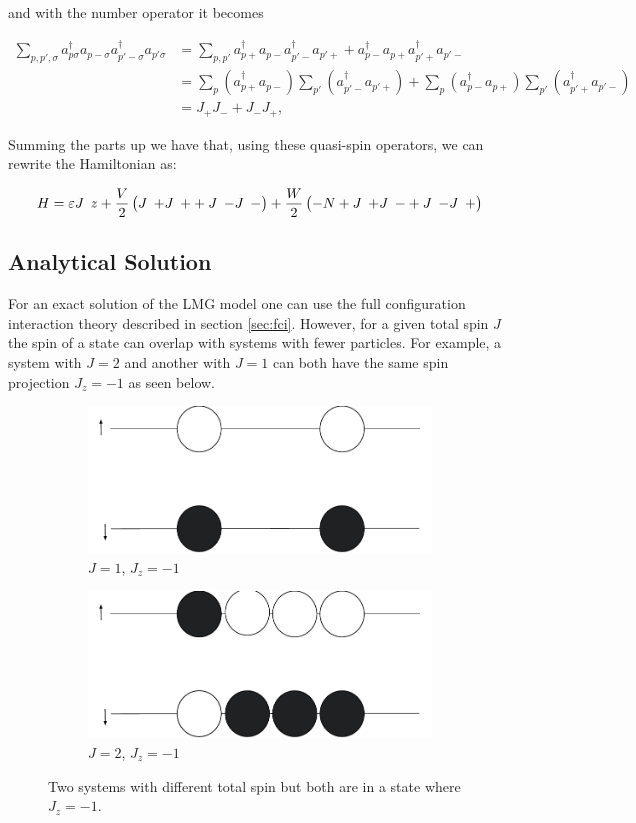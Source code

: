and with the number operator it becomes

\begin{align*}
\sum_{p,p',\sigma} a_{p\sigma}^\dagger a_{p-\sigma} a_{p'-\sigma}^\dagger a_{p'\sigma}
&= \sum_{p,p'} a_{p+}^\dagger a_{p-} a_{p'-}^\dagger a_{p'+} +
a_{p-}^\dagger a_{p+} a_{p'+}^\dagger a_{p'-} \\
&= \sum_p \left( a_{p+}^\dagger a_{p-} \right)
\sum_{p'} \left( a_{p'-}^\dagger a_{p'+} \right) +
\sum_p \left( a_{p-}^\dagger a_{p+} \right)
\sum_{p'} \left( a_{p'+}^\dagger a_{p'-} \right) \\
&= J_+ J_- + J_- J_+,
\end{align*}

Summing the parts up we have that, using these quasi-spin operators, we can rewrite the Hamiltonian as:

\begin{equation}\label{eq:quasiHamilt}
    H = \varepsilon \op{J}{z} + \frac{V}{2} \left ( \op{J}{+}\op{J}{+}  + \op{J}{-}\op{J}{-} \right ) + \frac{W}{2} \left ( -N + \op{J}{+} \op{J}{-} + \op{J}{-}\op{J}{+} \right )
\end{equation}

\subsection{Analytical Solution}

For an exact solution of the LMG model one can use the full configuration interaction theory described in section \ref{sec:fci}. However, for a given total spin $J$ the spin of a state can overlap with systems with fewer particles. For example, a system with $J=2$ and another with $J = 1$ can both have the same spin projection $J_z=-1$ as seen below.

\begin{figure}[H]
\centering
\begin{subfigure}{.5\textwidth}
  \centering
  \includegraphics[width=.6\textwidth]{Figures/Drawn/Lipkin/j=1.pdf}
  \caption{$J=1$, $J_z = -1$}
  \label{fig:J=1}
\end{subfigure}%
\begin{subfigure}{.5\textwidth}
  \centering
  \includegraphics[width=.6\textwidth]{Figures/Drawn/Lipkin/j=2.pdf}
  \caption{$J=2$, $J_z=-1$}
  \label{fig:J=2}
\end{subfigure}
\caption{Two systems with different total spin but both are in a state where $J_z=-1$.}
\end{figure}

